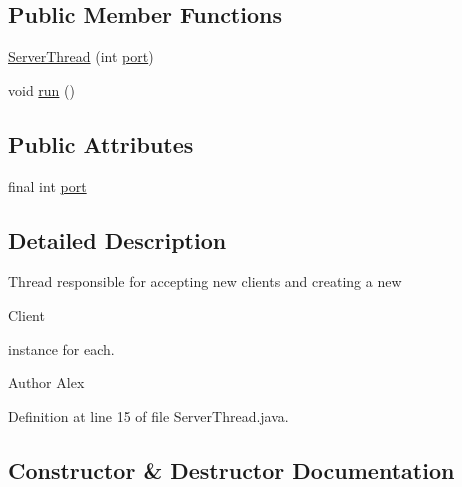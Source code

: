 \subsection*{Public Member Functions}
\begin{DoxyCompactItemize}
\item 
\hyperlink{classpt_1_1up_1_1fe_1_1lpro1613_1_1server_1_1conn_1_1_server_thread_a2a2c941ac08b8354d3c5ffa721372244}{Server\+Thread} (int \hyperlink{classpt_1_1up_1_1fe_1_1lpro1613_1_1server_1_1conn_1_1_server_thread_a89129be61d7282900277bab472083325}{port})
\item 
void \hyperlink{classpt_1_1up_1_1fe_1_1lpro1613_1_1server_1_1conn_1_1_server_thread_a78326abfc2bd35d8d4d3ac214ed3056c}{run} ()
\end{DoxyCompactItemize}
\subsection*{Public Attributes}
\begin{DoxyCompactItemize}
\item 
final int \hyperlink{classpt_1_1up_1_1fe_1_1lpro1613_1_1server_1_1conn_1_1_server_thread_a89129be61d7282900277bab472083325}{port}
\end{DoxyCompactItemize}


\subsection{Detailed Description}
Thread responsible for accepting new clients and creating a new 
\begin{DoxyCode}
Client 
\end{DoxyCode}
 instance for each.

\begin{DoxyAuthor}{Author}
Alex 
\end{DoxyAuthor}


Definition at line 15 of file Server\+Thread.\+java.



\subsection{Constructor \& Destructor Documentation}
\hypertarget{classpt_1_1up_1_1fe_1_1lpro1613_1_1server_1_1conn_1_1_server_thread_a2a2c941ac08b8354d3c5ffa721372244}{}\label{classpt_1_1up_1_1fe_1_1lpro1613_1_1server_1_1conn_1_1_server_thread_a2a2c941ac08b8354d3c5ffa721372244} 
